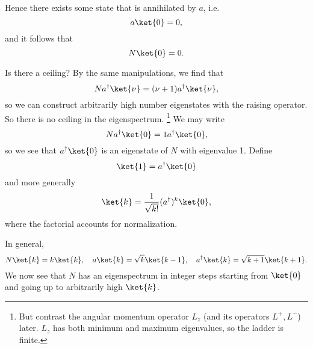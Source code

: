 Hence there exists some state that is annihilated by $a$, i.e. \begin{equation}
    a\ket{0} = 0,
\end{equation}
and it follows that
\begin{equation}
    N\ket{0}=0.
\end{equation}

Is there a ceiling? By the same manipulations, we find that
\begin{equation}
    Na^\dagger \ket{\nu} = (\nu+1) a^\dagger \ket{\nu},
\end{equation}
so we can construct arbitrarily high number eigenstates with the raising operator. So there is no ceiling in the eigenspectrum.%
    \footnote{But contrast the angular momentum operator $L_z$ (and its operators $L^+,L^-$) later. $L_z$ has both minimum and maximum eigenvalues, so the ladder is finite.}
We may write
\begin{equation}
    N a^\dagger \ket{0} = 1 a^\dagger \ket{0},
\end{equation}
so we see that $a^\dagger\ket{0}$ is an eigenstate of $N$ with eigenvalue 1. Define
\begin{equation}
    \ket{1} = a^\dagger \ket{0}
\end{equation}
and more generally
\begin{equation}
    \ket{k}=\frac{1}{\sqrt{k!}}(a^\dagger)^k \ket{0},
\end{equation}
where the factorial accounts for normalization.

In general,
\begin{equation}
    N\ket{k} = k\ket{k}, \quad a\ket{k} = \sqrt{k} \ket{k-1},\quad a^\dagger \ket{k} = \sqrt{k+1} \ket{k+1}.
\end{equation}
We now see that $N$ has an eigenspectrum in integer steps starting from $\ket{0}$ and going up to arbitrarily high $\ket{k}$.


